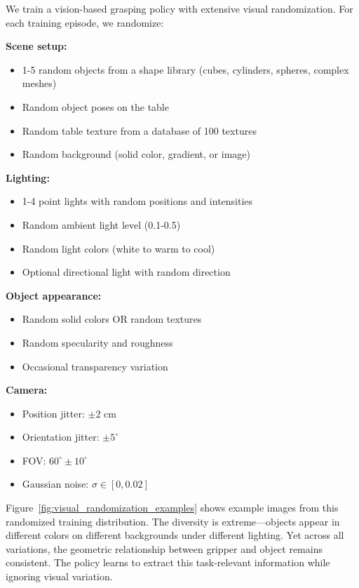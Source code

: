\begin{example}
\label{ex:visual_randomization_grasping}
We train a vision-based grasping policy with extensive visual randomization. For each training episode, we randomize:

\textbf{Scene setup:}
\begin{itemize}
    \item 1-5 random objects from a shape library (cubes, cylinders, spheres, complex meshes)
    \item Random object poses on the table
    \item Random table texture from a database of 100 textures
    \item Random background (solid color, gradient, or image)
\end{itemize}

\textbf{Lighting:}
\begin{itemize}
    \item 1-4 point lights with random positions and intensities
    \item Random ambient light level (0.1-0.5)
    \item Random light colors (white to warm to cool)
    \item Optional directional light with random direction
\end{itemize}

\textbf{Object appearance:}
\begin{itemize}
    \item Random solid colors OR random textures
    \item Random specularity and roughness
    \item Occasional transparency variation
\end{itemize}

\textbf{Camera:}
\begin{itemize}
    \item Position jitter: $\pm 2$ cm
    \item Orientation jitter: $\pm 5^\circ$
    \item FOV: $60^\circ \pm 10^\circ$
    \item Gaussian noise: $\sigma \in [0, 0.02]$
\end{itemize}

Figure~\ref{fig:visual_randomization_examples} shows example images from this randomized training distribution. The diversity is extreme---objects appear in different colors on different backgrounds under different lighting. Yet across all variations, the geometric relationship between gripper and object remains consistent. The policy learns to extract this task-relevant information while ignoring visual variation.
\end{example}

